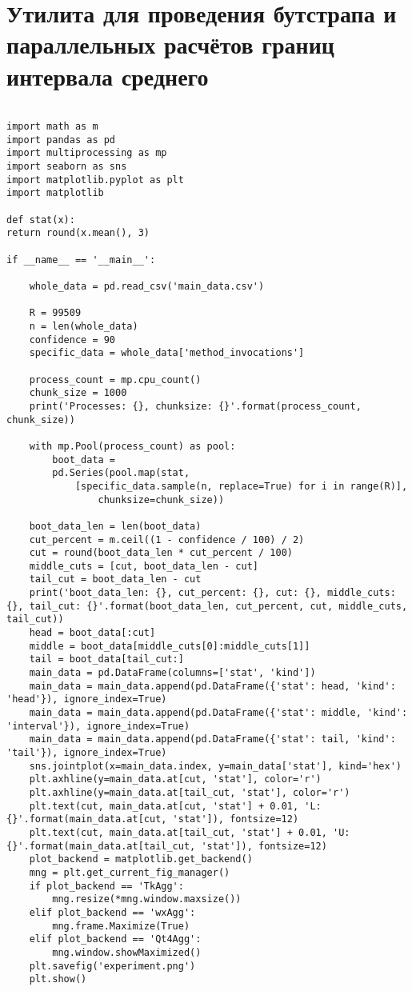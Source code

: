 \section{Утилита для проведения бутстрапа и параллельных расчётов границ интервала среднего}
\begin{lstlisting}[caption={Утилита для проведения бутстрапа и параллельных расчётов границ интервала среднего},label=bootstrap_experiment]

import math as m
import pandas as pd
import multiprocessing as mp
import seaborn as sns
import matplotlib.pyplot as plt
import matplotlib

def stat(x):
return round(x.mean(), 3)

if __name__ == '__main__':

	whole_data = pd.read_csv('main_data.csv')
	
	R = 99509
	n = len(whole_data)
	confidence = 90
	specific_data = whole_data['method_invocations']
	
	process_count = mp.cpu_count()
	chunk_size = 1000
	print('Processes: {}, chunksize: {}'.format(process_count, chunk_size))
	
	with mp.Pool(process_count) as pool:
		boot_data =
		pd.Series(pool.map(stat, 
			[specific_data.sample(n, replace=True) for i in range(R)], 
				chunksize=chunk_size))
	
	boot_data_len = len(boot_data)
	cut_percent = m.ceil((1 - confidence / 100) / 2)
	cut = round(boot_data_len * cut_percent / 100)
	middle_cuts = [cut, boot_data_len - cut]
	tail_cut = boot_data_len - cut
	print('boot_data_len: {}, cut_percent: {}, cut: {}, middle_cuts: {}, tail_cut: {}'.format(boot_data_len, cut_percent, cut, middle_cuts, tail_cut))
	head = boot_data[:cut]
	middle = boot_data[middle_cuts[0]:middle_cuts[1]]
	tail = boot_data[tail_cut:]
	main_data = pd.DataFrame(columns=['stat', 'kind'])
	main_data = main_data.append(pd.DataFrame({'stat': head, 'kind': 'head'}), ignore_index=True)
	main_data = main_data.append(pd.DataFrame({'stat': middle, 'kind': 'interval'}), ignore_index=True)
	main_data = main_data.append(pd.DataFrame({'stat': tail, 'kind': 'tail'}), ignore_index=True)
	sns.jointplot(x=main_data.index, y=main_data['stat'], kind='hex')
	plt.axhline(y=main_data.at[cut, 'stat'], color='r')
	plt.axhline(y=main_data.at[tail_cut, 'stat'], color='r')
	plt.text(cut, main_data.at[cut, 'stat'] + 0.01, 'L: {}'.format(main_data.at[cut, 'stat']), fontsize=12)
	plt.text(cut, main_data.at[tail_cut, 'stat'] + 0.01, 'U: {}'.format(main_data.at[tail_cut, 'stat']), fontsize=12)
	plot_backend = matplotlib.get_backend()
	mng = plt.get_current_fig_manager()
	if plot_backend == 'TkAgg':
		mng.resize(*mng.window.maxsize())
	elif plot_backend == 'wxAgg':
		mng.frame.Maximize(True)
	elif plot_backend == 'Qt4Agg':
		mng.window.showMaximized()
	plt.savefig('experiment.png')
	plt.show()


\end{lstlisting}
\newpage
